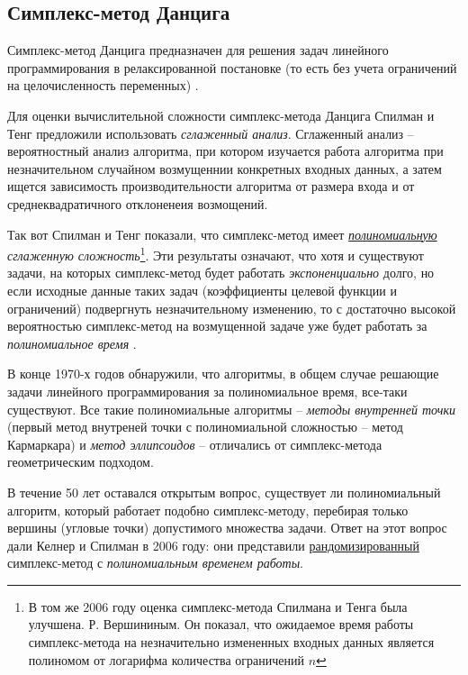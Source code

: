 \documentclass[%
	11pt,
	a4paper,
	utf8,
		]{article}
\begin{document}
\subsection{Симплекс-метод Данцига}

Симплекс-метод Данцига предназначен для решения задач линейного программирования в релаксированной постановке (то есть без учета ограничений на целочисленность переменных) \cite[]{achterberg:constr_int_prog}.


Для оценки вычислительной сложности симплекс-метода Данцига Спилман и Тенг предложили использовать \emph{сглаженный анализ}. Сглаженный анализ -- вероятностный анализ алгоритма, при котором изучается работа алгоритма при незначительном случайном возмущеннии конкретных входных данных, а затем ищется зависимость производительности алгоритма от размера входа и от среднеквадратичного отклоненеия возмощений.

Так вот Спилман и Тенг показали, что симплекс-метод имеет \emph{\underline{полиномиальную} сглаженную сложность}\footnote{В том же 2006 году оценка симплекс-метода Спилмана и Тенга была улучшена. Р. Вершининым. Он показал, что ожидаемое время работы симплекс-метода на незначительно измененных входных данных является полиномом от логарифма количества ограничений $ n $}. Эти результаты означают, что хотя и существуют задачи, на которых симплекс-метод будет работать \emph{экспоненциально} долго, но если исходные данные таких задач (коэффициенты целевой функции и ограничений) подвергнуть незначительному изменению, то с достаточно высокой вероятностью симплекс-метод на возмущенной задаче уже будет работать за \emph{полиномиальное время} \cite[]{vorontsova:convex_opt-2021}.

В конце 1970-х годов обнаружили, что алгоритмы, в общем случае решающие задачи линейного программирования за полиномиальное время, все-таки существуют. Все такие полиномиальные алгоритмы -- \emph{методы внутренней точки} (первый метод внутреней точки с полиномиальной сложностью -- метод Кармаркара) и \emph{метод эллипсоидов} -- отличались от симплекс-метода геометрическим подходом.

В течение 50 лет оставался открытым вопрос, существует ли полиномиальный алгоритм, который работает подобно симплекс-методу, перебирая только вершины (угловые точки) допустимого множества задачи. Ответ на этот вопрос дали Келнер и Спилман в 2006 году: они представили \underline{рандомизированный} симплекс-метод с \emph{полиномиальным временем работы}.
\end{document}
